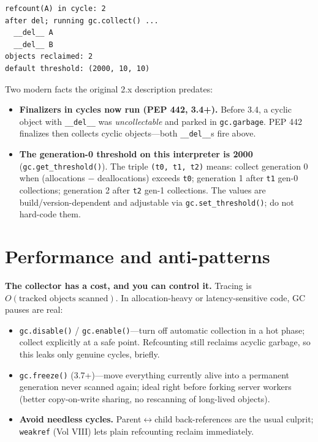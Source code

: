 \begin{lstlisting}[caption={Output}]
refcount(A) in cycle: 2
after del; running gc.collect() ...
  __del__ A
  __del__ B
objects reclaimed: 2
default threshold: (2000, 10, 10)
\end{lstlisting}

Two modern facts the original 2.x description predates:
\begin{itemize}
  \item \textbf{Finalizers in cycles now run (PEP 442, 3.4+).} Before 3.4, a cyclic object
    with \texttt{\_\_del\_\_} was \emph{uncollectable} and parked in \texttt{gc.garbage}. PEP
    442 finalizes then collects cyclic objects---both \texttt{\_\_del\_\_}s fire above.
  \item \textbf{The generation-0 threshold on this interpreter is 2000} (\texttt{gc.get\_threshold()}).
    The triple \texttt{(t0, t1, t2)} means: collect generation 0 when (allocations $-$
    deallocations) exceeds \texttt{t0}; generation 1 after \texttt{t1} gen-0 collections;
    generation 2 after \texttt{t2} gen-1 collections. The values are build/version-dependent
    and adjustable via \texttt{gc.set\_threshold()}; do not hard-code them.
\end{itemize}

\section{Performance and anti-patterns}

\textbf{The collector has a cost, and you can control it.} Tracing is $O(\text{tracked objects
scanned})$. In allocation-heavy or latency-sensitive code, GC pauses are real:
\begin{itemize}
  \item \texttt{gc.disable()} / \texttt{gc.enable()}---turn off automatic collection in a hot
    phase; collect explicitly at a safe point. Refcounting still reclaims acyclic garbage,
    so this leaks only genuine cycles, briefly.
  \item \texttt{gc.freeze()} (3.7+)---move everything currently alive into a permanent
    generation never scanned again; ideal right before forking server workers (better
    copy-on-write sharing, no rescanning of long-lived objects).
  \item \textbf{Avoid needless cycles.} Parent$\leftrightarrow$child back-references are the
    usual culprit; \texttt{weakref} (Vol VIII) lets plain refcounting reclaim immediately.
\end{itemize}

